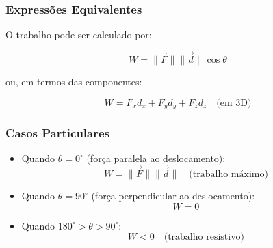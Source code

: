 \subsubsection*{Expressões Equivalentes}
O trabalho pode ser calculado por:

\begin{equation*}
  W = \|\vec{F}\| \|\vec{d}\| \cos\theta
\end{equation*}

ou, em termos das componentes:

\[
W = F_x d_x + F_y d_y + F_z d_z \quad \text{(em 3D)}
\]

\subsubsection*{Casos Particulares}
\begin{itemize}
  \item Quando $\theta = 0^\circ$ (força paralela ao deslocamento):
  \[
  W = \|\vec{F}\| \|\vec{d}\| \quad \text{(trabalho máximo)}
  \]
  
  \item Quando $\theta = 90^\circ$ (força perpendicular ao deslocamento):
  \[
  W = 0
  \]
  
  \item Quando $180^\circ > \theta > 90^\circ$:
  \[
  W < 0 \quad \text{(trabalho resistivo)}
  \]
\end{itemize}
